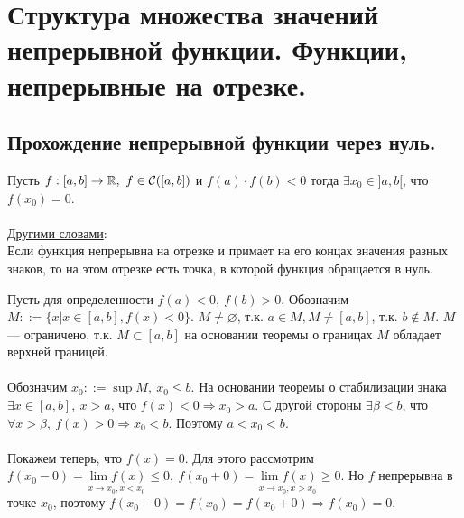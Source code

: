 \chapter{Структура множества значений непрерывной функции. Функции, непрерывные на отрезке.}
\section{Прохождение непрерывной функции через нуль.}
\begin{theorem}
	Пусть $f:[a, b] \rightarrow \mathbb{R}, \ f \in \mathcal{C} ([a,b])$ и $f(a)\cdot f(b) < 0 $  тогда $\exists x_0 \in ]a,b[$, что $f(x_0) = 0$.\\\\
	\underline{Другими словами}:\\
	Если функция непрерывна на отрезке и примает на его концах значения разных знаков, то на этом отрезке есть точка, в которой функция обращается в нуль.
\end{theorem}
\begin{Proof}
	Пусть для определенности $f(a) < 0,\ f(b) > 0 $.
	Обозначим $ M ::= \{x | x \in [a,b], f(x) < 0\} $.
	$M \neq \varnothing$, т.к. $a \in M, M \neq [a,b]$, т.к. $b \notin M$.
	$M$ --- ограничено, т.к. $M \subset [a,b]$  на основании теоремы о границах $M$ обладает верхней границей.\\\\
	Обозначим $x_0 ::= \sup M,\ x_0 \leqslant b$.
	На основании теоремы о стабилизации знака $\exists x \in [a,b],\ x > a$, что $f(x) < 0 \Rightarrow x_0 > a$. С другой стороны $\exists \beta < b$, что $\forall x > \beta, \ f(x) > 0 \Rightarrow x_0 < b$. Поэтому $a < x_0 < b$.\\\\
	Покажем теперь, что $f(x) = 0$. Для этого рассмотрим $f(x_0-0) = \underset{x \rightarrow x_0, x < x_0}{\lim f(x)} \leqslant 0, \ f(x_0+0) = \underset{x \rightarrow x_0, x > x_0}{\lim f(x)} \geqslant 0 $. Но $f$ непрерывна в точке $x_0$, поэтому $f(x_0-0) = f(x_0) = f(x_0+0) \Rightarrow f(x_0) = 0$.
\end{Proof}
